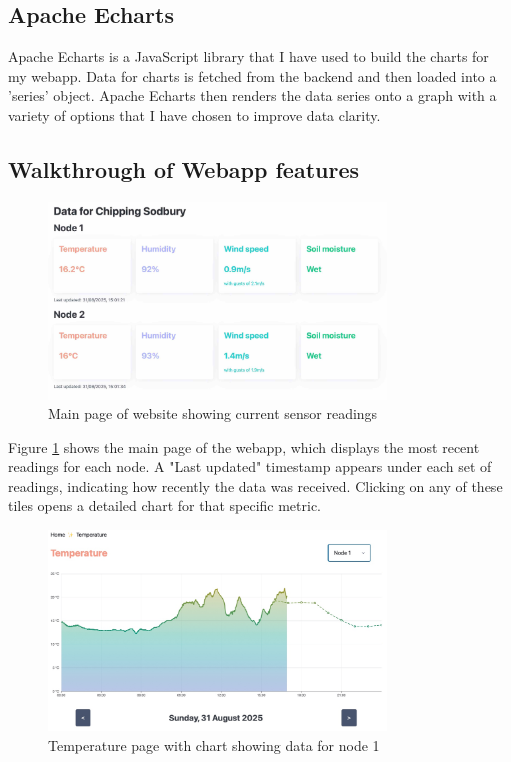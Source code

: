\subsection{Apache Echarts}

Apache Echarts is a JavaScript library that I have used to build the charts for
my webapp. Data for charts is fetched from the backend and then loaded into a
'series' object. Apache Echarts then renders the data series onto a graph with a
variety of options that I have chosen to improve data clarity.

\subsection{ Walkthrough of Webapp features}\label{sec:walkthrough}

\begin{figure}[H]
    \centering
    \includegraphics[width=0.8\textwidth]{contents/part-3/fig3/main-page.jpg}
    \caption{Main page of website showing current sensor readings}
    \label{fig:main-page}
\end{figure}

Figure \ref{fig:main-page} shows the main page of the webapp, which displays the
most recent readings for each node. A "Last updated" timestamp appears under
each set of readings, indicating how recently the data was received. Clicking on
any of these tiles opens a detailed chart for that specific metric.

\begin{figure}[H]
    \centering
    \includegraphics[width=0.8\textwidth]{contents/part-3/fig3/temperature-node-one.jpg}
    \caption{Temperature page with chart showing data for node 1}
    \label{fig:temp-page}
\end{figure}

